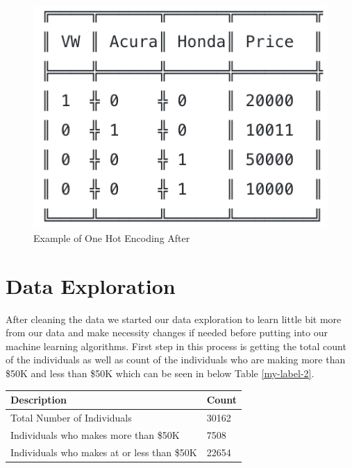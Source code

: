 \documentclass[sigconf]{acmart}
\begin{document}
 \begin{figure}[!ht]
  \centering
      \includegraphics[width=\columnwidth]{project/images/one-hot-after.png}
  \caption{Example of One Hot Encoding After \cite{www-hackernoon}}\label{fig:one-hot-after}
\end{figure}

\section{Data Exploration}

After cleaning the data we started our data exploration to learn little bit more from our data and make necessity changes if needed before putting into our machine learning algorithms. First step in this process is getting the total count of the individuals as well as count of the individuals who are making more than \$50K and less than \$50K which can be seen in below Table \ref{my-label-2}.

\begin{center}
\centering
\begin{tabular}{ll}
\hline
\multicolumn{1}{|l|}{\textbf{Description}} & \multicolumn{1}{l|}{\textbf{Count}} \\ \hline
Total Number of Individuals                & 30162                               \\ \hline
Individuals who makes more than \$50K        & 7508                                \\ \hline
Individuals who makes at or less than \$50K  & 22654                              \\ \hline
\end{tabular}
\label{my-label-2}
\end{center}
\end{document}

